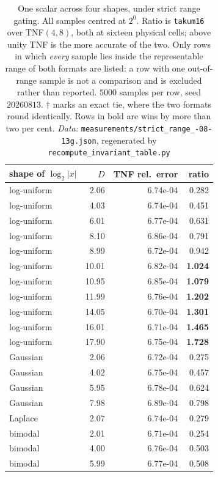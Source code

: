 \begin{table}[htbp]\centering
\caption{One scalar across four shapes, under strict range gating. All samples
centred at $2^0$. Ratio is \texttt{takum16} over TNF$(4,8)$, both at sixteen
physical cells; above unity TNF is the more accurate of the two. Only rows in
which \emph{every} sample lies inside the representable range of both formats are
listed: a row with one out-of-range sample is not a comparison and is excluded
rather than reported. $5000$ samples per row, seed $20260813$. $\dagger$ marks an
exact tie, where the two formats round identically. Rows in bold are wins by more
than two per cent. \emph{Data:} \texttt{measurements/\allowbreak strict\_\allowbreak range\_-08-13g.json}, regenerated by \texttt{recompute\_\allowbreak invariant\_\allowbreak table.py}}
\label{tab:invariant}
\begin{tabular}{lrrr}
\hline
shape of $\log_2|x|$ & $D$ & TNF rel.\ error & ratio \\
\hline
log-uniform & 2.06 & 6.74e-04 & 0.282 \\
log-uniform & 4.03 & 6.74e-04 & 0.451 \\
log-uniform & 6.01 & 6.77e-04 & 0.631 \\
log-uniform & 8.10 & 6.86e-04 & 0.791 \\
log-uniform & 8.99 & 6.72e-04 & 0.942 \\
log-uniform & 10.01 & 6.82e-04 & \textbf{1.024} \\
log-uniform & 10.95 & 6.85e-04 & \textbf{1.079} \\
log-uniform & 11.99 & 6.76e-04 & \textbf{1.202} \\
log-uniform & 14.05 & 6.70e-04 & \textbf{1.301} \\
log-uniform & 16.01 & 6.71e-04 & \textbf{1.465} \\
log-uniform & 17.90 & 6.75e-04 & \textbf{1.728} \\
\hline
Gaussian & 2.06 & 6.72e-04 & 0.275 \\
Gaussian & 4.02 & 6.75e-04 & 0.457 \\
Gaussian & 5.95 & 6.78e-04 & 0.624 \\
Gaussian & 7.98 & 6.89e-04 & 0.798 \\
\hline
Laplace & 2.07 & 6.74e-04 & 0.279 \\
\hline
bimodal & 2.01 & 6.71e-04 & 0.254 \\
bimodal & 4.00 & 6.76e-04 & 0.503 \\
bimodal & 5.99 & 6.77e-04 & 0.508 \\

\end{tabular}
\end{table}
